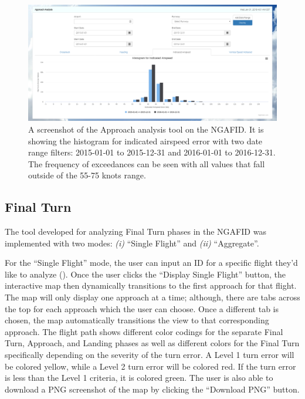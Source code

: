     	\begin{figure}
    		\centering
            \includegraphics[width=\linewidth]{img/approach_tool_screenshot}
            \caption{A screenshot of the Approach analysis tool on the NGAFID.  It is showing the histogram for indicated airspeed error with two date range filters: 2015-01-01 to 2015-12-31 and 2016-01-01 to 2016-12-31.  The frequency of exceedances can be seen with all values that fall outside of the 55-75 knots range.}
            \label{fig:approach_tool_screenshot}
    	\end{figure}
    
    
    \subsection{Final Turn}
    
    	The tool developed for analyzing Final Turn phases in the NGAFID was implemented with two modes:  \textit{(i)} ``Single Flight'' and \textit{(ii)} ``Aggregate''.
    
    	For the ``Single Flight'' mode, the user can input an ID for a specific flight they'd like to analyze ().  Once the user clicks the ``Display Single Flight'' button, the interactive map then dynamically transitions to the first approach for that flight.  The map will only display one approach at a time; although, there are tabs across the top for each approach which the user can choose.  Once a different tab is chosen, the map automatically transitions the view to that corresponding approach.  The flight path shows different color codings for the separate Final Turn, Approach, and Landing phases as well as different colors for the Final Turn specifically depending on the severity of the turn error.  A Level 1 turn error will be colored yellow, while a Level 2 turn error will be colored red.  If the turn error is less than the Level 1 criteria, it is colored green.  The user is also able to download a PNG screenshot of the map by clicking the ``Download PNG'' button.
        
